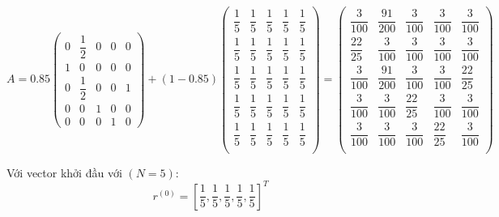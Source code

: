 $$
A = 0.85 
            \begin{pmatrix}
                 0 & \dfrac{1}{2} & 0 & 0 & 0 \\[10pt]
                1 & 0 & 0 & 0 & 0 \\[10pt]
                0 & \dfrac{1}{2} & 0 & 0 & 1 \\[10pt]
                0 & 0 & 1 & 0 & 0 \\[10pt]
                0 & 0 & 0 & 1 & 0
            \end{pmatrix}
            + (1 - 0.85 )  
             \begin{pmatrix}
                \dfrac{1}{5} & \dfrac{1}{5}& \dfrac{1}{5} & \dfrac{1}{5} & \dfrac{1}{5} \\[10pt]
                \dfrac{1}{5} & \dfrac{1}{5} & \dfrac{1}{5} & \dfrac{1}{5} & \dfrac{1}{5} \\[10pt]
                \dfrac{1}{5} & \dfrac{1}{5} & \dfrac{1}{5} & \dfrac{1}{5} & \dfrac{1}{5} \\[10pt]
                \dfrac{1}{5} & \dfrac{1}{5} & \dfrac{1}{5} & \dfrac{1}{5} & \dfrac{1}{5} \\[10pt]
                \dfrac{1}{5} & \dfrac{1}{5} & \dfrac{1}{5} & \dfrac{1}{5} & \dfrac{1}{5} \\[10pt]
            \end{pmatrix}
            =
            \begin{pmatrix}
                \dfrac{3}{100} & \dfrac{91}{200}& \dfrac{3}{100} & \dfrac{3}{100} & \dfrac{3}{100} \\[10pt]
                \dfrac{22}{25} & \dfrac{3}{100} & \dfrac{3}{100} & \dfrac{3}{100} & \dfrac{3}{100} \\[10pt]
                \dfrac{3}{100} & \dfrac{91}{200} & \dfrac{3}{100} & \dfrac{3}{100} & \dfrac{22}{25} \\[10pt]
                \dfrac{3}{100} & \dfrac{3}{100} & \dfrac{22}{25} & \dfrac{3}{100} & \dfrac{3}{100} \\[10pt]
                \dfrac{3}{100} & \dfrac{3}{100} & \dfrac{3}{100} & \dfrac{22}{25} & \dfrac{3}{100} \\[10pt] 
            \end{pmatrix}
$$

Với vector khởi đầu với $(N = 5)$: 
             $$
                        r^{(0)} = \left[\frac{1}{5},\frac{1}{5},\frac{1}{5},\frac{1}{5},\frac{1}{5}\right] ^ T 
            $$
            
